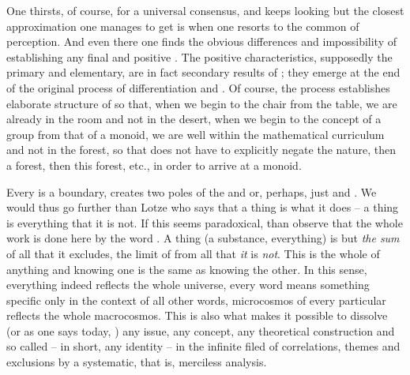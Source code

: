 \pa One thirsts, of course, for a universal consensus, and keeps looking but the
closest approximation one manages to get is when one resorts to the common
 of perception. And even there one finds the obvious differences and
impossibility of establishing any final and positive .
The positive characteristics, supposedly the primary and elementary, are in fact
secondary results of ; they emerge at the end of the
original process of differentiation and . Of course, the
process establishes elaborate structure of  so that, when we
begin to  the chair from the table, we are already in the room
and not in the desert, when we begin to  the concept of a group
from that of a monoid, we are well within the mathematical curriculum and not in
the forest, so that  does not have to explicitly negate the nature,
then a forest, then this forest, etc., in order to arrive at a monoid.

Every  is a boundary, creates two poles of the  and
 or, perhaps, just  and . We would thus go
further than Lotze who says that a thing is what it does -- a thing is
everything that it is not. If this seems paradoxical, than observe that the
whole work is done here by the word . A thing (a substance,
everything) is but {\em the sum} of all that it excludes, the limit of
 from all that {\em it} is {\em not}. This is the whole
 of anything and knowing one is the same as knowing the
other. In this sense, everything indeed reflects the whole universe, every word
means something specific only in the context of all other words, microcosmos of
every particular reflects the whole macrocosmos.  This is also what makes it
possible to dissolve (or as one says today, ) any issue, any
concept, any theoretical construction and so called  -- in
short, any identity -- in the infinite filed of correlations, themes and
exclusions by a systematic, that is, merciless analysis.

